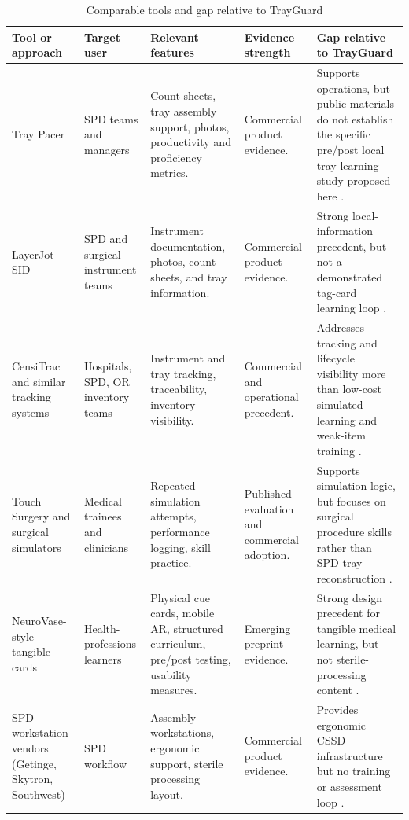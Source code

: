 \documentclass[10pt,a4paper]{article}
\begin{document}
\begin{table}[H]
\centering
\caption{Comparable tools and gap relative to TrayGuard}
\label{tab:comparable-tools-and-gap-relative-to-trayguard}
\small\renewcommand{\arraystretch}{1.2}\setlength{\tabcolsep}{3pt}
\begin{tabularx}{\textwidth}{|>{\raggedright\arraybackslash}p{2.5cm}|>{\raggedright\arraybackslash}p{2.5cm}|>{\raggedright\arraybackslash}X|>{\raggedright\arraybackslash}p{2cm}|>{\raggedright\arraybackslash}X|}
\hline
Tool or approach & Target user & Relevant features & Evidence strength & Gap relative to TrayGuard \\
\hline
Tray Pacer & SPD teams and managers & Count sheets, tray assembly support, photos, productivity and proficiency metrics. & Commercial product evidence. & Supports operations, but public materials do not establish the specific pre/post local tray learning study proposed here \cite{tray-pacer-accessed-2026}. \\
\hline
LayerJot SID & SPD and surgical instrument teams & Instrument documentation, photos, count sheets, and tray information. & Commercial product evidence. & Strong local-information precedent, but not a demonstrated tag-card learning loop \cite{layerjot-sid-accessed-2026}. \\
\hline
CensiTrac and similar tracking systems & Hospitals, SPD, OR inventory teams & Instrument and tray tracking, traceability, inventory visibility. & Commercial and operational precedent. & Addresses tracking and lifecycle visibility more than low-cost simulated learning and weak-item training \cite{censitrac-accessed-2026}. \\
\hline
Touch Surgery and surgical simulators & Medical trainees and clinicians & Repeated simulation attempts, performance logging, skill practice. & Published evaluation and commercial adoption. & Supports simulation logic, but focuses on surgical procedure skills rather than SPD tray reconstruction \cite{tulipan-et-al-2019, medtronic-touch-surgery-accessed-2026}. \\
\hline
NeuroVase-style tangible cards & Health-professions learners & Physical cue cards, mobile AR, structured curriculum, pre/post testing, usability measures. & Emerging preprint evidence. & Strong design precedent for tangible medical learning, but not sterile-processing content \cite{jahani-et-al-2026-neurovase}. \\
\hline
SPD workstation vendors (Getinge, Skytron, Southwest) & SPD workflow & Assembly workstations, ergonomic support, sterile processing layout. & Commercial product evidence. & Provides ergonomic CSSD infrastructure but no training or assessment loop \cite{getinge-prep-pack-accessed-2026, skytron-prep-pack-accessed-2026, southwest-cssd-tables-accessed-2026, southwest-spd-workstations-accessed-2026}. \\

\end{tabularx}
\end{table}
\end{document}
